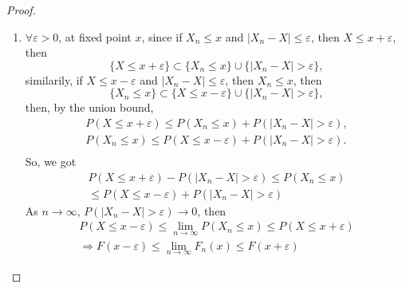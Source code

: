 \begin{proof}
    \begin{enumerate}
        \item $\forall\varepsilon>0$, at fixed point $x$, since if $X_n\leq x$ and $|X_n-X|\leq\varepsilon$, then $X\leq x+\varepsilon$, then
              \begin{equation*}
                  \{X\leq x+\varepsilon\}\subset\{X_n\leq x\}\cup\{|X_n-X|>\varepsilon\},
              \end{equation*}
              similarily, if $X\leq x-\varepsilon$ and $|X_n-X|\leq\varepsilon$, then $X_n\leq x$, then
              \begin{equation*}
                  \{X_n\leq x\}\subset\{X\leq x-\varepsilon\}\cup\{|X_n-X|>\varepsilon\},
              \end{equation*}
              then, by the union bound,
              \begin{equation*}
                  \begin{gathered}
                      P\left(X\leq x+\varepsilon\right)\leq P\left(X_n\leq x\right)+P\left(|X_n-X|>\varepsilon\right),\\
                      P\left(X_n\leq x\right)\leq P\left(X\leq x-\varepsilon\right)+P\left(|X_n-X|>\varepsilon\right).\\
                  \end{gathered}
              \end{equation*}
              So, we got
              \begin{equation*}
                  \begin{gathered}
                      P\left(X\leq x+\varepsilon\right)-P\left(|X_n-X|>\varepsilon\right)\leq P\left(X_n\leq x\right) \\
                      \leq P\left(X\leq x-\varepsilon\right)+P\left(|X_n-X|>\varepsilon\right)
                  \end{gathered}
              \end{equation*}
              As $n\rightarrow\infty$, $P\left(|X_n-X|>\varepsilon\right)\rightarrow 0$, then
              \begin{equation*}
                  \begin{gathered}
                      P\left(X\leq x-\varepsilon\right)\leq\lim_{n\rightarrow\infty}P\left(X_n\leq x\right)\leq P\left(X\leq x+\varepsilon\right) \\
                      \Rightarrow F(x-\varepsilon)\leq \lim_{n\rightarrow\infty}F_n(x)\leq F(x+\varepsilon)

\end{gathered}
\end{equation*}
\end{enumerate}
\end{proof}
